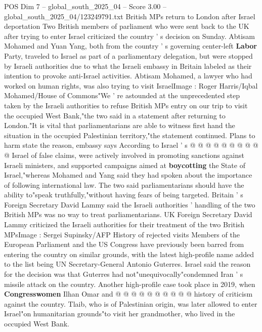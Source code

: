 \begin{textsample}{POS Dim 7 – global\_south\_2025\_04 – Score 3.00 – global\_south\_2025\_04/123249791.txt}  \label{ex:f7_pos_414}
British MPs return to London after Israel deportation Two British members of parliament who were sent back to the UK after trying to enter Israel criticized the country ' s decision on Sunday.
Abtisam Mohamed and Yuan Yang, both from the country ' s governing center-left \textbf{Labor} Party, traveled to Israel as part of a parliamentary delegation, but were stopped by Israeli authorities due to what the Israeli embassy in Britain labeled as their intention to provoke anti-Israel activities.
Abtisam Mohamed, a lawyer who had worked on human rights, was also trying to visit IsraelImage : Roger Harris/Iqbal Mohamed/House of Commons"We ' re astounded at the unprecedented step taken by the Israeli authorities to refuse British MPs entry on our trip to visit the occupied West Bank,"the two said in a statement after returning to London."It is vital that parliamentarians are able to witness first hand the situation in the occupied Palestinian territory,"the statement continued.
Plans to harm state the reason, embassy says According to Israel ' s @ @ @ @ @ @ @ @ @ @ Israel of false claims, were actively involved in promoting sanctions against Israeli ministers, and supported campaigns aimed at \textbf{boycotting} the State of Israel,"whereas Mohamed and Yang said they had spoken about the importance of following international law.
The two said parliamentarians should have the ability to"speak truthfully,"without having fears of being targeted.
Britain ' s Foreign Secretary David Lammy said the Israeli authorities ' handling of the two British MPs was no way to treat parliamentarians.
UK Foreign Secretary David Lammy criticized the Israeli authorities for their treatment of the two British MPsImage : Sergei Supinsky/AFP History of rejected visits Members of the European Parliament and the US Congress have previously been barred from entering the country on similar grounds, with the latest high-profile name added to the list being UN Secretary-General Antonio Guterres.
Israel said the reason for the decision was that Guterres had not"unequivocally"condemned Iran ' s missile attack on the country.
Another high-profile case took place in 2019, when \textbf{Congresswomen} Ilhan Omar and @ @ @ @ @ @ @ @ @ @ history of criticism against the country.
Tlaib, who is of Palestinian origin, was later allowed to enter Israel"on humanitarian grounds"to visit her grandmother, who lived in the occupied West Bank.

\end{textsample}
